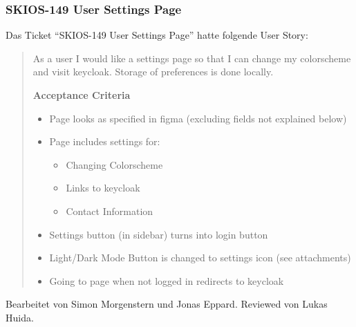 \subsubsection{SKIOS-149 User Settings Page}
Das Ticket \enquote{SKIOS-149 User Settings Page} hatte folgende User Story:
\begin{quotation}
As a user I would like a settings page so that I can change my colorscheme and visit keycloak.
Storage of preferences is done locally.

\textbf{Acceptance Criteria}
\begin{itemize}
    \item Page looks as specified in figma (excluding fields not explained below)
    \item Page includes settings for:
    \begin{itemize}
        \item Changing Colorscheme
        \item Links to keycloak
        \item Contact Information
    \end{itemize}
    \item Settings button (in sidebar) turns into login button
    \item Light/Dark Mode Button is changed to settings icon (see attachments)
    \item Going to page when not logged in redirects to keycloak
\end{itemize}
\end{quotation}
Bearbeitet von Simon Morgenstern und Jonas Eppard.
Reviewed von Lukas Huida.
